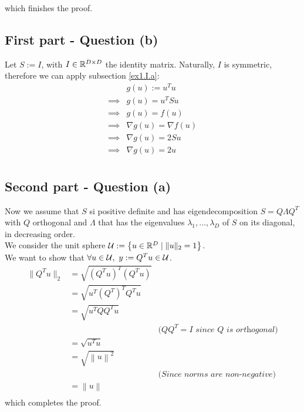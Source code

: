 \documentclass[12pt]{article}
\begin{document}
which finishes the proof.

\subsection{First part - Question (b)}
Let \(S := I\), with \(I \in \mathbb{R}^{D \times D}\) the identity matrix. Naturally, \(I\) is symmetric, therefore we can apply subsection \ref{ex1.I.a}:
\begin{align*}
             & g(u) := u^T u             \\
    \implies & g(u) = u^T S u            \\
    \implies & g(u) = f(u)               \\
    \implies & \nabla g(u) = \nabla f(u) \\
    \implies & \nabla g(u) = 2Su         \\
    \implies & \nabla g(u) = 2u          \\
\end{align*}

\subsection{Second part - Question (a)}
Now we assume that \(S\) si positive definite and has eigendecomposition \(S = Q \Lambda Q^T\) with \(Q\) orthogonal and \(\Lambda\) that has the eigenvalues \(\lambda_1, \ldots, \lambda_D\) of \(S\) on its diagonal, in decreasing order.\\
We consider the unit sphere \(\mathcal{U} := \left\{ u \in \mathbb{R}^D \mid \| u \|_2 = 1\right\}\).\\
We want to show that \(\forall u \in \mathcal{U}, \ y := Q^T u \in \mathcal{U}\).\\
\begin{align*}
    \| Q^T u \|_2
     & = \sqrt{\left( Q^T u \right)^T \left( Q^T u \right)}                                                       \\
     & = \sqrt{u^T \left( Q^T \right)^T Q^T u}                                                                    \\
     & = \sqrt{u^T Q Q^T u}                                                                                       \\
     &                                                      & (QQ^T=I \textit{ since } Q \textit{ is orthogonal)} \\
     & = \sqrt{u^T u}                                                                                             \\
     & = \sqrt{\left\| u \right\|^2}                                                                              \\
     &                                                      & \textit{(Since norms are non-negative)}             \\
     & = \left\| u \right\|                                                                                       \\
\end{align*}
which completes the proof.
\end{document}
